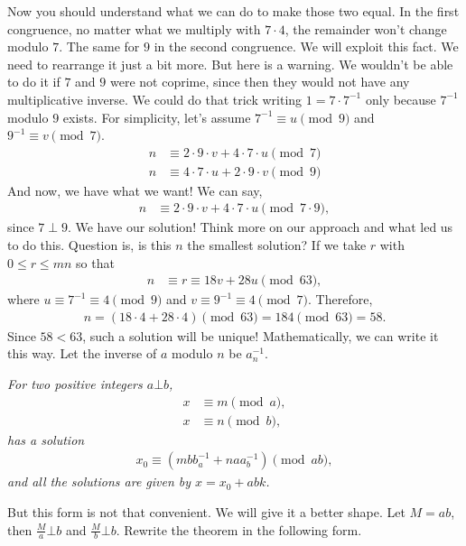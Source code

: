 \documentclass{subfile}
\begin{document}
	Now you should understand what we can do to make those two equal. In the first congruence, no matter what we multiply with $7\cdot4$, the remainder won't change modulo $7$. The same for $9$ in the second congruence. We will exploit this fact. We need to rearrange it just a bit more. But here is a warning. We wouldn't be able to do it if $7$ and $9$ were not coprime, since then they would not have any multiplicative inverse. We could do that trick writing $1=7\cdot7^{-1}$ only because $7^{-1}$ modulo $9$ exists. For simplicity, let's assume $7^{-1}\equiv u\pmod{9}$ and $9^{-1}\equiv v\pmod{7}$.
		\begin{align*}
			n & \equiv2\cdot9\cdot v+4\cdot7\cdot u\pmod{7}\\
			n & \equiv4\cdot7\cdot u+2\cdot9\cdot v\pmod{9}
		\end{align*}
	And now, we have what we want! We can say,
		\begin{align*}
			n & \equiv2\cdot9\cdot v+4\cdot7\cdot u\pmod{7\cdot9},
		\end{align*}
	since $7 \perp 9$. We have our solution! Think more on our approach and what led us to do this. Question is, is this $n$ the smallest solution? If we take $r$ with $0\leq r\leq mn$ so that
		\begin{align*}
			n & \equiv r\equiv18v+28u\pmod{63},
		\end{align*}
	where $u\equiv7^{-1}\equiv4\pmod9$ and $v\equiv9^{-1}\equiv4\pmod 7$. Therefore,
		\begin{align*}
			n = (18\cdot4+28\cdot4)\pmod{63}=184\pmod{63}=58.
		\end{align*}
	Since $58<63$, such a solution will be unique! Mathematically, we can write it this way. Let the inverse of $a$ modulo $n$ be $a^{-1}_n$.
		\begin{theorem}\slshape
			For two positive integers $a\bot b$,
				\begin{align*}
					x & \equiv m\pmod a,\\
					x & \equiv n\pmod b,
				\end{align*}
			has a solution 
				\begin{align*}
					x_0 \equiv (mbb^{-1}_a+naa^{-1}_b)\pmod{ab},
				\end{align*}
			and all the solutions are given by $x=x_0+abk$.
		\end{theorem}
	But this form is not that convenient. We will give it a better shape. Let $M=ab$, then $\frac{M}{a}\bot b$ and $\frac{M}{b}\bot b$. Rewrite the theorem in the following form.
\end{document}
